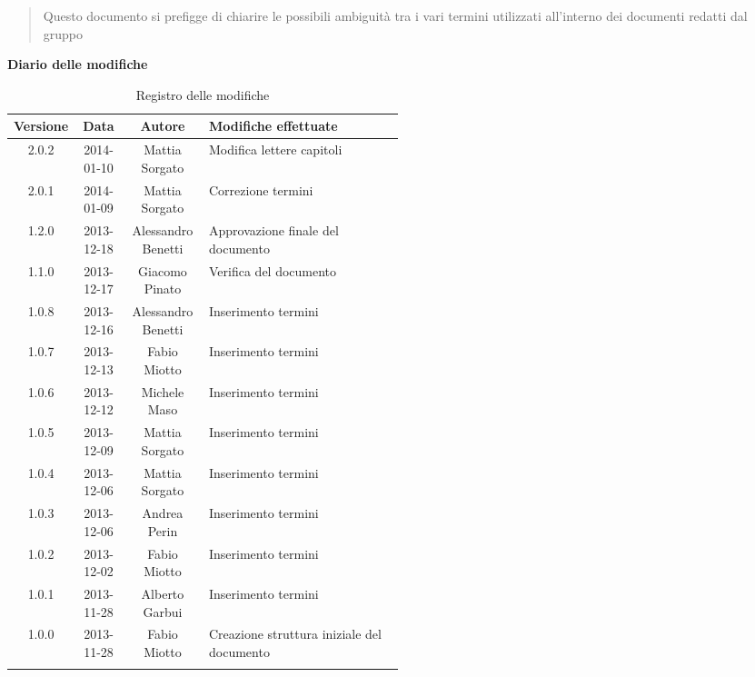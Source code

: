 \begin{abstract}
\begin{center}
Questo documento si prefigge di chiarire le possibili ambiguità tra i vari termini utilizzati all'interno dei documenti redatti dal gruppo \NomeGruppo{}
\end{center}
\end{abstract}

\newpage
\textbf{Diario delle modifiche}
\begin{center}
\begin{longtable}{|c|c|c|p{0.5\linewidth}|}
\toprule
\textbf{Versione} & \textbf{Data} & \textbf{Autore} & \textbf{Modifiche effettuate}\\
\midrule
2.0.2 & 2014-01-10 & Mattia Sorgato & Modifica lettere capitoli\\
\midrule
2.0.1 & 2014-01-09 & Mattia Sorgato & Correzione termini\\
\midrule
1.2.0 & 2013-12-18 & Alessandro Benetti & Approvazione finale del documento\\
\midrule
1.1.0 & 2013-12-17 & Giacomo Pinato & Verifica del documento \\
\midrule
1.0.8 & 2013-12-16 & Alessandro Benetti & Inserimento termini\\
\midrule
1.0.7 & 2013-12-13 & Fabio Miotto & Inserimento termini\\
\midrule
1.0.6 & 2013-12-12 & Michele Maso & Inserimento termini\\
\midrule
1.0.5 & 2013-12-09 & Mattia Sorgato & Inserimento termini\\
\midrule
1.0.4 & 2013-12-06 & Mattia Sorgato & Inserimento termini \\
\midrule
1.0.3 & 2013-12-06 & Andrea Perin & Inserimento termini\\
\midrule
1.0.2 & 2013-12-02 & Fabio Miotto & Inserimento termini\\
\midrule
1.0.1 & 2013-11-28 & Alberto Garbui & Inserimento termini\\
\midrule
1.0.0 & 2013-11-28 & Fabio Miotto & Creazione struttura iniziale del documento\\


\bottomrule
\caption{Registro delle modifiche}
\label{tab:changelog}
\end{longtable}
\end{center}


